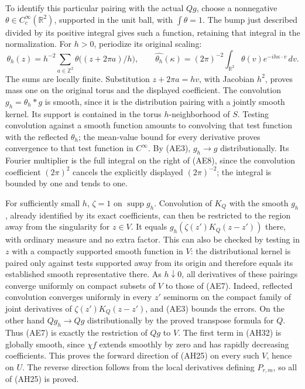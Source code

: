 \documentclass[
  11pt,
]{article}
\begin{document}
To identify this particular pairing with the actual \(Qg\), choose a
nonnegative \(\theta\in C_c^\infty(\mathbb R^2)\), supported in the unit
ball, with \(\int\theta=1\). The bump just described divided by its
positive integral gives such a function, retaining that integral in the
normalization. For \(h>0\), periodize its original scaling: \[
 \theta_h(z)=h^{-2}\sum_{a\in\mathbb Z^2}
                     \theta\bigl((z+2\pi a)/h\bigr),
 \qquad
 \widehat{\theta_h}(\kappa)
   =(2\pi)^{-2}\int_{\mathbb R^2}
                   \theta(v)e^{-ih\kappa\cdot v}\,dv.
 \tag{AE8}
\] The sums are locally finite. Substitution \(z+2\pi a=hv\), with
Jacobian \(h^2\), proves mass one on the original torus and the
displayed coefficient. The convolution \(g_h=\theta_h*g\) is smooth,
since it is the distribution pairing with a jointly smooth kernel. Its
support is contained in the torus \(h\)-neighborhood of \(S\). Testing
convolution against a smooth function amounts to convolving that test
function with the reflected \(\theta_h\); the mean-value bound for every
derivative proves convergence to that test function in \(C^\infty\). By
(AE3), \(g_h\to g\) distributionally. Its Fourier multiplier is the full
integral on the right of (AE8), since the convolution coefficient
\((2\pi)^2\) cancels the explicitly displayed \((2\pi)^{-2}\); the
integral is bounded by one and tends to one.

For sufficiently small \(h\), \(\zeta=1\) on \(\operatorname{supp}g_h\).
Convolution of \(K_Q\) with the smooth \(g_h\), already identified by
its exact coefficients, can then be restricted to the region away from
the singularity for \(z\in V\). It equals \(g_h(\zeta(z')K_Q(z-z'))\)
there, with ordinary measure and no extra factor. This can also be
checked by testing in \(z\) with a compactly supported smooth function
in \(V\): the distributional kernel is paired only against tests
supported away from its origin and therefore equals its established
smooth representative there. As \(h\downarrow0\), all derivatives of
these pairings converge uniformly on compact subsets of \(V\) to those
of (AE7). Indeed, reflected convolution converges uniformly in every
\(z'\) seminorm on the compact family of joint derivatives of
\(\zeta(z')K_Q(z-z')\), and (AE3) bounds the errors. On the other hand
\(Qg_h\to Qg\) distributionally by the proved transpose formula for
\(Q\). Thus (AE7) is exactly the restriction of \(Qg\) to \(V\). The
first term in (AH32) is globally smooth, since \(\chi f\) extends
smoothly by zero and has rapidly decreasing coefficients. This proves
the forward direction of (AH25) on every such \(V\), hence on \(U\). The
reverse direction follows from the local derivatives defining
\(P_{r,m}\), so all of (AH25) is proved.
\end{document}
